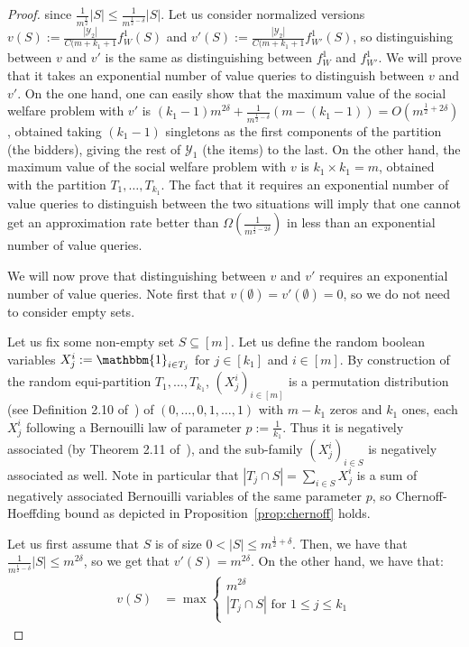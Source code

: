 \begin{proof}
  since $\frac{1}{m^{\frac{1}{2}}}|S| \leq \frac{1}{m^{\frac{1}{2}-\delta}}|S|$. Let us consider normalized versions $v(S) := \frac{|\mathcal{Y}_2|}{C(m+k_1+1}f_W^1(S)$ and $v'(S) := \frac{|\mathcal{Y}_2|}{C(m+k_1+1}f_{W'}^1(S)$, so distinguishing between $v$ and $v'$ is the same as distinguishing between $f_W^1$ and $f_{W'}^1$. We will prove that it takes an exponential number of value queries to distinguish between $v$ and $v'$. On the one hand, one can easily show that the maximum value of the social welfare problem with $v'$ is $(k_1-1)m^{2\delta}+\frac{1}{m^{\frac{1}{2}-\delta}}(m-(k_1-1)) = O(m^{\frac{1}{2}+2\delta})$, obtained taking $(k_1-1)$ singletons as the first components of the partition (the bidders), giving the rest of $\mathcal{Y}_1$ (the items) to the last. On the other hand, the maximum value of the social welfare problem with $v$ is $k_1 \times k_1 = m$, obtained with the partition $T_1, \ldots, T_{k_1}$. The fact that it requires an exponential number of value queries to distinguish between the two situations will imply that one cannot get an approximation rate better than $\Omega\left(\frac{1}{m^{\frac{1}{2}-2\delta}}\right)$ in less than an exponential number of value queries.

  We will now prove that distinguishing between $v$ and $v'$ requires an exponential number of value queries. Note first that $v(\emptyset) = v'(\emptyset) = 0$, so we do not need to consider empty sets.

  Let us fix some non-empty set $S \subseteq [m]$. Let us define the random boolean variables $X_j^i := \mathbbm{1}_{i \in T_j}$ for $j \in [k_1]$ and $i \in [m]$. By construction of the random equi-partition $T_1, \ldots, T_{k_1}$, $(X_j^i)_{i \in [m]}$ is a permutation distribution (see Definition 2.10 of~\cite{JP83}) of $(0,\ldots,0,1,\ldots,1)$ with $m-k_1$ zeros and $k_1$ ones, each $X_j^i$ following a Bernouilli law of parameter $p := \frac{1}{k_1}$. Thus it is negatively associated (by Theorem 2.11 of~\cite{JP83}), and the sub-family $(X_j^i)_{i \in S}$ is negatively associated as well. Note in particular that $|T_j \cap S| = \sum_{i \in S} X_j^i$ is a sum of negatively associated Bernouilli variables of the same parameter $p$, so Chernoff-Hoeffding bound as depicted in Proposition~\ref{prop:chernoff} holds.
  
  Let us first assume that $S$ is of size $0 < |S| \leq m^{\frac{1}{2}+\delta}$. Then, we have that $\frac{1}{m^{\frac{1}{2}-\delta}}|S| \leq m^{2\delta}$, so we get that $v'(S) = m^{2\delta}$. On the other hand, we have that:
    \begin{equation}
    \begin{aligned}
      v(S) &= \max\begin{cases}
      m^{2\delta}\\
      |T_j \cap S| \text{ for } 1 \leq j \leq k_1\\
      \end{cases}
    \end{aligned}
    \end{equation}


\end{proof}
